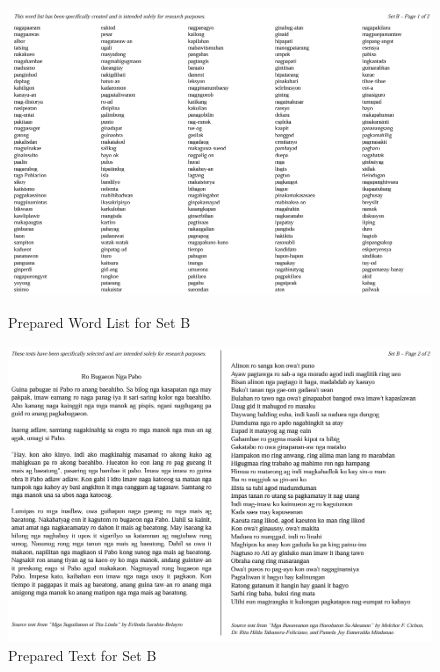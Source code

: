 \begin{figure}[h!]
	\centering
	\includegraphics[width=\textwidth]{./appendix/setB1.png}
	\caption{Prepared Word List for Set B}
	\includegraphics[width=\textwidth]{./appendix/setB2.png}
	\caption{Prepared Text for Set B}
	\label{fig:setB}
\end{figure}

